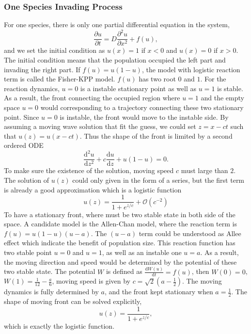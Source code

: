 \subsubsection{One Species Invading Process} For one species, there is only one partial differential equation in the system, \begin{equation}\label{eqn:single_species} \frac{\partial u}{\partial t} = D \frac{\partial ^2 u} {\partial x^2} + f(u), \end{equation} and we set the initial condition as $u(x) = 1$ if $x<0$ and $u(x) = 0$ if $x>0$. The initial condition means that the population occupied the left part and invading the right part. If $f(u) = u(1-u)$, the model with logistic reaction term is called the Fisher-KPP model. $f(u)$ has two root $0$ and $1$. For the reaction dynamics, $u=0$ is a instable stationary point as well as $u=1$ is stable. As a result, the front connecting the occupied region where $u = 1$ and the empty space $u=0$ would corresponding to a trajectory connecting these two stationary point. Since $u=0$ is instable, the front would move to the instable side. By assuming a moving wave solution that fit the guess, we could set $z = x-ct$ such that $u(z) = u(x-ct)$. Thus the shape of the front is limited by a second ordered ODE \begin{equation*} \frac{\mathrm{d}^2 u}{\mathrm{d} z^2} + c \frac{\mathrm{d} u}{\mathrm{d} z} + u(1-u) = 0. \end{equation*} To make sure the existence of the solution, moving speed $c$ must large than $2$. The solution of $u(z)$ could only given in the form of a series, but the first term is already a good approximation which is a logistic function \begin{equation} u(z) = \frac{1}{1 + e^{z/c}} + \mathcal{O}(c^{-2}) \end{equation} To have a stationary front, where must be two stable state in both side of the space. A candidate model is the Allen-Chan model, where the reaction term is $f(u) = u(1-u)(u-a)$. The $(u-a)$ term could be understood as Allee effect which indicate the benefit of population size. This reaction function has two stable point $u = 0$ and $u = 1$, as well as an instable one $u = a$. As a result, the moving direction and speed would be determined by the potential of these two stable state. The potential $W$ is defined as $\frac{\mathrm{d} W(u)}{\mathrm{d} t} = f(u)$, then $W(0) = 0$, $W(1) = \frac{1}{12} - \frac{a}{6}$, moving speed is given by $c = \sqrt{2}(a - \frac{1}{2})$. The moving dynamics is fully determined by $a$, and the front kept stationary when $a = \frac{1}{2}$. The shape of moving front can be solved explicitly, \begin{equation} u(z) = \frac{1}{1 + e^{z/c}}, \end{equation} which is exactly the logistic function.

